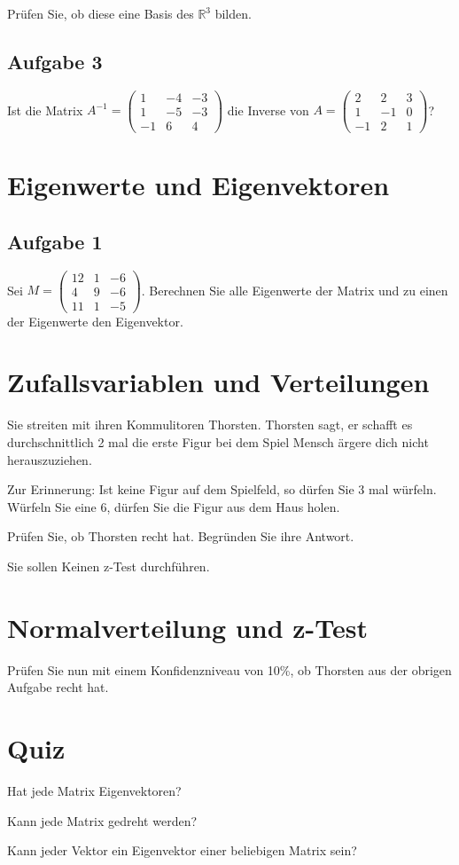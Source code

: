 Prüfen Sie, ob diese eine Basis des $\mathbb{R}^3$ bilden.

\subsection{Aufgabe 3}

Ist die Matrix $A^{-1} = \begin{pmatrix}
        1  & -4 & -3 \\
        1  & -5 & -3 \\
        -1 & 6  & 4
    \end{pmatrix}$ die Inverse von $A = \begin{pmatrix}
        2  & 2  & 3 \\
        1  & -1 & 0 \\
        -1 & 2  & 1
    \end{pmatrix}$?

\section{Eigenwerte und Eigenvektoren}

\subsection{Aufgabe 1}

Sei $M = \begin{pmatrix}
        12 & 1 & -6 \\
        4  & 9 & -6 \\
        11 & 1 & -5
    \end{pmatrix}$.
Berechnen Sie alle Eigenwerte der Matrix und zu einen der Eigenwerte den Eigenvektor.

\section{Zufallsvariablen und Verteilungen}

Sie streiten mit ihren Kommulitoren Thorsten. Thorsten sagt, er schafft es
durchschnittlich 2 mal die erste Figur bei dem Spiel Mensch ärgere dich nicht
herauszuziehen.

Zur Erinnerung: Ist keine Figur auf dem Spielfeld, so dürfen Sie 3 mal würfeln.
Würfeln Sie eine 6, dürfen Sie die Figur aus dem Haus holen.

Prüfen Sie, ob Thorsten recht hat. Begründen Sie ihre Antwort.

Sie sollen Keinen z-Test durchführen.

\section{Normalverteilung und z-Test}

Prüfen Sie nun mit einem Konfidenzniveau von 10\%, ob Thorsten aus der obrigen Aufgabe recht hat.

\section{Quiz}

Hat jede Matrix Eigenvektoren?

Kann jede Matrix gedreht werden?

Kann jeder Vektor ein Eigenvektor einer beliebigen Matrix sein?